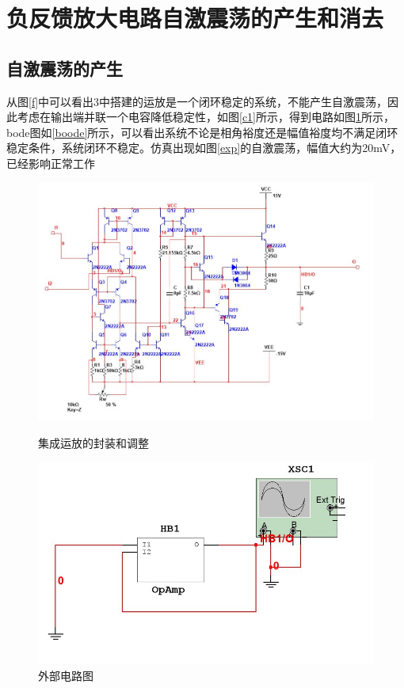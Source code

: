 \documentclass[UTF8,a4paper]{ctexart}
\begin{document}
\section{负反馈放大电路自激震荡的产生和消去}
\subsection{自激震荡的产生}
从图\ref{f}中可以看出3中搭建的运放是一个闭环稳定的系统，不能产生自激震荡，因此考虑在输出端并联一个电容降低稳定性，如图\ref{c1}所示，得到电路如图\ref{CC}所示，bode图如\ref{boode}所示，可以看出系统不论是相角裕度还是幅值裕度均不满足闭环稳定条件，系统闭环不稳定。仿真出现如图\ref{exp}的自激震荡，幅值大约为20mV，已经影响正常工作
\begin{figure}
\centering
\includegraphics[width=\textwidth]{4-c2.jpg}
\caption{集成运放的封装和调整}
\label{c1}
\includegraphics[width=\textwidth]{4-c.jpg}
\caption{外部电路图}
\label{CC}
\end{figure}
\end{document}
